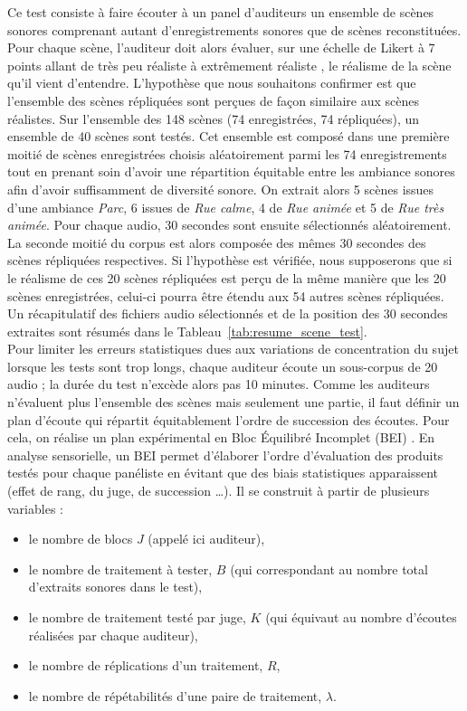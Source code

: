 Ce test consiste à faire écouter à un panel d'auditeurs un ensemble de scènes sonores comprenant autant d'enregistrements sonores que de scènes reconstituées. Pour chaque scène, l'auditeur doit alors évaluer, sur une échelle de Likert à 7 points allant de \og très peu réaliste \fg{} à \og extrêmement réaliste \fg{}, le réalisme de la scène qu'il vient d'entendre. L'hypothèse que nous souhaitons confirmer est que l'ensemble des scènes répliquées sont perçues de façon similaire aux scènes réalistes.
Sur l'ensemble des 148 scènes (74 enregistrées, 74 répliquées), un ensemble de 40 scènes sont testés.
Cet ensemble est composé dans une première moitié de scènes enregistrées choisis aléatoirement parmi les 74 enregistrements tout en prenant soin d'avoir une répartition équitable entre les ambiance sonores afin d'avoir suffisamment de diversité sonore. On extrait alors 5 scènes issues d'une ambiance \textit{Parc}, 6 issues de \textit{Rue calme}, 4 de \textit{Rue animée} et 5 de \textit{Rue très animée}. Pour chaque audio, 30 secondes sont ensuite sélectionnés aléatoirement.
La seconde moitié du corpus est alors composée des mêmes 30 secondes des scènes répliquées respectives. Si l'hypothèse est vérifiée, nous supposerons que si le réalisme de ces 20 scènes répliquées est perçu de la même manière que les 20 scènes enregistrées, celui-ci pourra être étendu aux 54 autres scènes répliquées. Un récapitulatif des fichiers audio sélectionnés et de la position des 30 secondes extraites sont résumés dans le Tableau~\ref{tab:resume_scene_test}.\\



Pour limiter les erreurs statistiques dues aux variations de concentration du sujet lorsque les tests sont trop longs, chaque auditeur écoute un sous-corpus de 20 audio ; la durée du test n'excède alors pas 10 minutes. Comme les auditeurs n'évaluent plus l'ensemble des scènes mais seulement une partie, il faut définir un plan d'écoute qui répartit équitablement l'ordre de succession des écoutes. Pour cela, on réalise un plan expérimental en \og Bloc Équilibré Incomplet \fg{} (BEI) \cite{pages_blocs_2007}.
En analyse sensorielle, un BEI permet d'élaborer l'ordre d'évaluation des produits testés pour chaque panéliste en évitant que des biais statistiques apparaissent (effet de rang, du juge, de succession \dots). Il se construit à partir de plusieurs variables :

\begin{itemize}
\item le nombre de blocs $J$ (appelé ici auditeur),
\item le nombre de traitement à tester, $B$ (qui correspondant au nombre total d'extraits sonores dans le test),
\item le nombre de traitement testé par juge, $K$ (qui équivaut au nombre d'écoutes réalisées par chaque auditeur),
\item le nombre de réplications d'un traitement, $R$,
\item le nombre de répétabilités d'une paire de traitement, $\lambda$.\\
\end{itemize}

